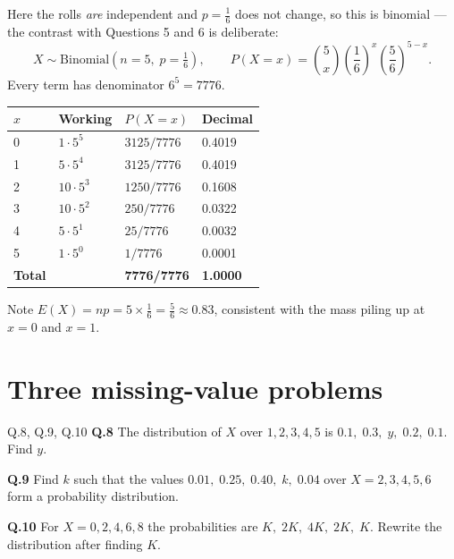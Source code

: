 \begin{solution}
Here the rolls \emph{are} independent and $p=\tfrac16$ does not change, so this
is binomial --- the contrast with Questions 5 and 6 is deliberate:
\[
X\sim\text{Binomial}\!\left(n=5,\;p=\tfrac16\right),\qquad
P(X=x)=\binom{5}{x}\left(\frac{1}{6}\right)^{x}\left(\frac{5}{6}\right)^{5-x}.
\]
Every term has denominator $6^{5}=7776$.

\begin{center}
\small\sffamily
\begin{tabular}{@{}C{1.4cm} L{5.4cm} C{2.4cm} C{2.0cm}@{}}
\toprule
$x$ & Working & $P(X=x)$ & Decimal \\
 & $1\cdot 5^{5}$   & $3125/7776$ & 0.4019 \\
1 & $5\cdot 5^{4}$   & $3125/7776$ & 0.4019 \\
2 & $10\cdot 5^{3}$  & $1250/7776$ & 0.1608 \\
3 & $10\cdot 5^{2}$  & $250/7776$  & 0.0322 \\
4 & $5\cdot 5^{1}$   & $25/7776$   & 0.0032 \\
5 & $1\cdot 5^{0}$   & $1/7776$    & 0.0001 \\
\midrule
\textbf{Total} & & \textbf{7776/7776} & \textbf{1.0000} \\
\bottomrule
\end{tabular}
\end{center}


\medskip
Note $E(X)=np=5\times\tfrac16=\tfrac56\approx 0.83$, consistent with the mass
piling up at $x=0$ and $x=1$.

\end{solution}

\section{Three missing-value problems}

\begin{question}{Q.8, Q.9, Q.10}
\textbf{Q.8} The distribution of $X$ over $1,2,3,4,5$ is
$0.1,\;0.3,\;y,\;0.2,\;0.1$. Find $y$.

\smallskip
\textbf{Q.9} Find $k$ such that the values $0.01,\;0.25,\;0.40,\;k,\;0.04$ over
$X=2,3,4,5,6$ form a probability distribution.

\smallskip
\textbf{Q.10} For $X=0,2,4,6,8$ the probabilities are
$K,\;2K,\;4K,\;2K,\;K$. Rewrite the distribution after finding $K$.
\end{question}

